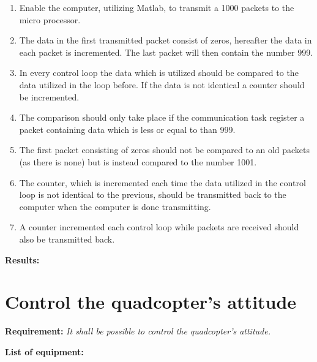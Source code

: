 \begin{enumerate}
	\item Enable the computer, utilizing Matlab, to transmit a 1000 packets to the micro processor.
	\item The data in the first transmitted packet consist of zeros, hereafter the data in each packet is incremented. The last packet will then contain the number 999. 
	\item In every control loop the data which is utilized should be compared to the data utilized in the loop before. If the data is not identical a counter should be incremented. 
	\item The comparison should only take place if the communication task register a packet containing data which is less or equal to than 999.
	\item The first packet consisting of zeros should not be compared to an old packets (as there is none) but is instead compared to the number 1001. 
	\item The counter, which is incremented each time the data utilized in the control loop is not identical to the previous, should be transmitted back to the computer when the computer is done transmitting.
	\item A counter incremented each control loop while packets are received should also be transmitted back.
\end{enumerate} 

\textbf{Results:}


\section{Control the quadcopter's attitude} \label{sec:accepttestAttitude}
\textbf{Requirement:}
\textit{It shall be possible to control the quadcopter's attitude.}


\textbf{List of equipment:}	

